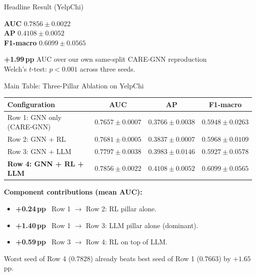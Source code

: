 \documentclass[aspectratio=169,10pt]{beamer}
\begin{document}
\begin{frame}{Headline Result (YelpChi)}
    \vspace{0.8em}
    \begin{center}
    \Large
    \textcolor{accent}{\textbf{AUC} \quad $\mathbf{0.7856 \pm 0.0022}$} \\[0.4em]
    \textcolor{accent}{\textbf{AP} \quad\;\; $\mathbf{0.4108 \pm 0.0052}$} \\[0.4em]
    \textcolor{accent}{\textbf{F1-macro} \quad $\mathbf{0.6099 \pm 0.0565}$}
    \end{center}
    \vspace{0.8em}
    \begin{center}\normalsize
    \textbf{+1.99\,pp} AUC over our own same-split CARE-GNN reproduction\\[0.3em]
    Welch's $t$-test: $p < 0.001$ across three seeds.
    \end{center}
\end{frame}

\begin{frame}{Main Table: Three-Pillar Ablation on YelpChi}
    \begin{center}\small
    \begin{tabular}{@{}lccc@{}}
        \toprule
        \textbf{Configuration} & \textbf{AUC} & \textbf{AP} & \textbf{F1-macro} \\
        \midrule
        Row 1: GNN only (CARE-GNN)    & $0.7657 \pm 0.0007$ & $0.3766 \pm 0.0038$ & $0.5948 \pm 0.0263$ \\
        Row 2: GNN + RL               & $0.7681 \pm 0.0005$ & $0.3837 \pm 0.0007$ & $0.5968 \pm 0.0109$ \\
        Row 3: GNN + LLM              & $0.7797 \pm 0.0038$ & $0.3983 \pm 0.0146$ & $0.5927 \pm 0.0578$ \\
        \textbf{Row 4: GNN + RL + LLM} & $\mathbf{0.7856 \pm 0.0022}$ & $\mathbf{0.4108 \pm 0.0052}$ & $\mathbf{0.6099 \pm 0.0565}$ \\
        \bottomrule
    \end{tabular}
    \end{center}
    \vspace{0.5em}
    \textbf{Component contributions (mean AUC):}
    \begin{itemize}\small
        \item \textcolor{positive}{\textbf{+0.24\,pp}} \, Row 1 $\to$ Row 2: RL pillar alone.
        \item \textcolor{positive}{\textbf{+1.40\,pp}} \, Row 1 $\to$ Row 3: LLM pillar alone (dominant).
        \item \textcolor{positive}{\textbf{+0.59\,pp}} \, Row 3 $\to$ Row 4: RL on top of LLM.
    \end{itemize}
    \vspace{0.3em}
    Worst seed of Row 4 ($0.7828$) already beats best seed of Row 1 ($0.7663$) by $+1.65$\,pp.
\end{frame}
\end{document}
